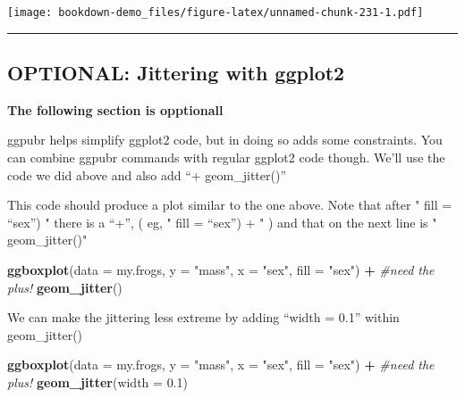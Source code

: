 \documentclass[]{book}
\newenvironment{Shaded}{\begin{snugshade}}{\end{snugshade}}
\newcommand{\KeywordTok}[1]{\textcolor[rgb]{0.13,0.29,0.53}{\textbf{#1}}}
\newcommand{\DataTypeTok}[1]{\textcolor[rgb]{0.13,0.29,0.53}{#1}}
\newcommand{\FloatTok}[1]{\textcolor[rgb]{0.00,0.00,0.81}{#1}}
\newcommand{\StringTok}[1]{\textcolor[rgb]{0.31,0.60,0.02}{#1}}
\newcommand{\CommentTok}[1]{\textcolor[rgb]{0.56,0.35,0.01}{\textit{#1}}}
\newcommand{\OperatorTok}[1]{\textcolor[rgb]{0.81,0.36,0.00}{\textbf{#1}}}
\newcommand{\NormalTok}[1]{#1}
\theoremstyle{definition}
\theoremstyle{definition}
\theoremstyle{definition}
\theoremstyle{remark}
\begin{document}
\texttt{[image: bookdown-demo\_files/figure-latex/unnamed-chunk-231-1.pdf]}

\begin{center}\rule{0.5\linewidth}{\linethickness}\end{center}

\subsection{OPTIONAL: Jittering with
ggplot2}\label{optional-jittering-with-ggplot2}

\textbf{The following section is opptionall}

ggpubr helps simplify ggplot2 code, but in doing so adds some
constraints. You can combine ggpubr commands with regular ggplot2 code
though. We'll use the code we did above and also add ``+
geom\_jitter()''

This code should produce a plot similar to the one above. Note that
after " fill = ``sex'') " there is a ``+'', ( eg, " fill = ``sex'') + "
) and that on the next line is " geom\_jitter()"

\begin{Shaded}
\begin{Highlighting}[]
\KeywordTok{ggboxplot}\NormalTok{(}\DataTypeTok{data =}\NormalTok{ my.frogs,}
          \DataTypeTok{y =} \StringTok{"mass"}\NormalTok{,}
          \DataTypeTok{x =} \StringTok{"sex"}\NormalTok{,}
          \DataTypeTok{fill =} \StringTok{"sex"}\NormalTok{) }\OperatorTok{+}\StringTok{  }\CommentTok{#need the plus!}
\StringTok{  }\KeywordTok{geom_jitter}\NormalTok{()}
\end{Highlighting}
\end{Shaded}

We can make the jittering less extreme by adding ``width = 0.1'' within
geom\_jitter()

\begin{Shaded}
\begin{Highlighting}[]
\KeywordTok{ggboxplot}\NormalTok{(}\DataTypeTok{data =}\NormalTok{ my.frogs,}
          \DataTypeTok{y =} \StringTok{"mass"}\NormalTok{,}
          \DataTypeTok{x =} \StringTok{"sex"}\NormalTok{,}
          \DataTypeTok{fill =} \StringTok{"sex"}\NormalTok{) }\OperatorTok{+}\StringTok{  }\CommentTok{#need the plus!}
\StringTok{  }\KeywordTok{geom_jitter}\NormalTok{(}\DataTypeTok{width =} \FloatTok{0.1}\NormalTok{)}
\end{Highlighting}
\end{Shaded}
\end{document}
